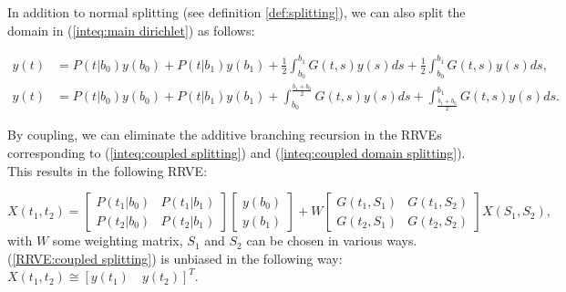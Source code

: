 \documentclass[a4paper,12pt]{article}
\begin{document}
\begin{example} \label{ex:coupled splitting}
  In addition to normal splitting (see definition \ref{def:splitting}),
  we can also split the domain in (\ref{inteq:main dirichlet})
  as follows:

  \begin{align}\label{inteq:coupled splitting}
    y(t) & = P(t|b_{0}) y(b_{0}) + P(t|b_{1}) y(b_{1}) +
    \frac{1}{2} \int_{b_{0}}^{b_{1}} G(t,s)y(s) ds +
    \frac{1}{2} \int_{b_{0}}^{b_{1}} G(t,s)y(s) ds,                                             \\
    y(t) & = P(t|b_{0}) y(b_{0}) + P(t|b_{1}) y(b_{1}) + \label{inteq:coupled domain splitting}
    \int_{b_{0}}^{\frac{b_{1}+b_{0}}{2}} G(t,s)y(s) ds +
    \int_{\frac{b_{1}+b_{0}}{2}}^{b_{1}} G(t,s)y(s) ds.
  \end{align}

  By coupling, we can eliminate the additive branching recursion
  in the RRVEs corresponding to (\ref{inteq:coupled splitting})
  and (\ref{inteq:coupled domain splitting}).
  This results in the following RRVE:

  \begin{equation} \label{RRVE:coupled splitting}
    X(t_{1},t_{2})=
    \begin{bmatrix}
      P(t_{1}|b_{0}) & P(t_{1}|b_{1}) \\
      P(t_{2}|b_{0}) & P(t_{2}|b_{1})
    \end{bmatrix}
    \begin{bmatrix}
      y(b_{0}) \\
      y(b_{1})
    \end{bmatrix}
    +
    W
    \begin{bmatrix}
      G(t_{1},S_{1}) & G(t_{1},S_{2}) \\
      G(t_{2},S_{1}) & G(t_{2},S_{2})
    \end{bmatrix}
    X(S_{1},S_{2}),
  \end{equation}
  with $W$ some weighting matrix,
  $S_{1}$ and $S_{2}$ can be chosen
  in various ways. (\ref{RRVE:coupled splitting}) is unbiased in the following way:
  $X(t_{1},t_{2}) \cong [y(t_{1}) \quad y(t_{2})]^{T}$.

\end{example}
\end{document}
